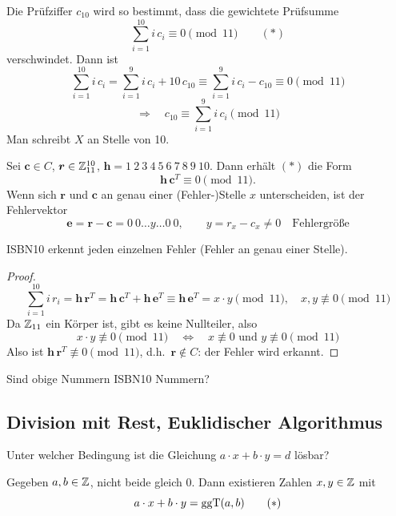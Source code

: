 Die Prüfziffer $c_{10}$ wird so bestimmt, dass die gewichtete Prüfsumme
\[ \sum_{i=1}^{10} i\, c_i \equiv 0 \pmod{11} \qquad (*) \]
verschwindet. Dann ist
\[ \sum_{i=1}^{10} i\, c_i = \sum_{i=1}^{9} i\, c_i + 10\, c_{10} \equiv \sum_{i=1}^{9} i\, c_i - c_{10} \equiv 0 \pmod{11} \]
\[ \Rightarrow \quad c_{10} \equiv \sum_{i=1}^{9} i\, c_i \pmod{11} \]
Man schreibt $X$ an Stelle von 10.

Sei $\boldsymbol{c} \in C$, $\boldsymbol{r} \in \mathbb{Z}_{11}^{10}$, $\boldsymbol{h} = 1\ 2\ 3\ 4\ 5\ 6\ 7\ 8\ 9\ 10$. Dann erhält $(*)$ die Form
\[ \boldsymbol{h}\, \boldsymbol{c}^T \equiv 0 \pmod{11}. \]
Wenn sich $\boldsymbol{r}$ und $\boldsymbol{c}$ an genau einer (Fehler-)Stelle $x$ unterscheiden, ist der Fehlervektor
\[ \boldsymbol{e} = \boldsymbol{r} - \boldsymbol{c} = 0\ 0 \ldots y \ldots 0\ 0, \qquad y = r_x - c_x \neq 0 \quad \text{Fehlergröße} \]

\begin{satz}
ISBN10 erkennt jeden einzelnen Fehler (Fehler an genau einer Stelle).
\end{satz}

\begin{proof}
\[ \sum_{i=1}^{10} i\, r_i = \boldsymbol{h}\, \boldsymbol{r}^T = \boldsymbol{h}\, \boldsymbol{c}^T + \boldsymbol{h}\, \boldsymbol{e}^T \equiv \boldsymbol{h}\, \boldsymbol{e}^T = x \cdot y \pmod{11}, \quad x, y \not\equiv 0 \pmod{11} \]
Da $\mathbb{Z}_{11}$ ein Körper ist, gibt es keine Nullteiler, also
\[ x \cdot y \not\equiv 0 \pmod{11} \quad \Leftrightarrow \quad x \not\equiv 0 \text{ und } y \not\equiv 0 \pmod{11} \]
Also ist $\boldsymbol{h}\, \boldsymbol{r}^T \not\equiv 0 \pmod{11}$, d.h.\ $\boldsymbol{r} \notin C$: der Fehler wird erkannt.
\end{proof}

\begin{beispiel}
Sind obige Nummern ISBN10 Nummern?
\end{beispiel}

\subsection{Division mit Rest, Euklidischer Algorithmus}

Unter welcher Bedingung ist die Gleichung $a \cdot x + b \cdot y = d$ lösbar?

\begin{lemma}
Gegeben $a, b \in \mathbb{Z}$, nicht beide gleich $0$. Dann existieren Zahlen $x, y \in \mathbb{Z}$ mit
\[ a \cdot x + b \cdot y = \operatorname{ggT}(a, b) \qquad (*) \]
\end{lemma}

